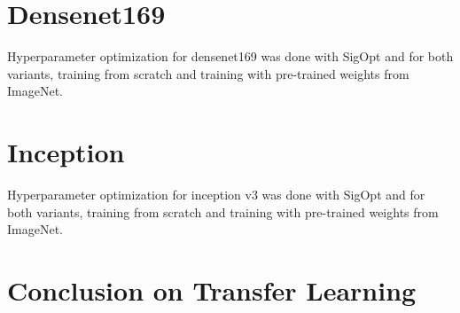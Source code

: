 




\section{Densenet169}

Hyperparameter optimization for densenet169 was done with SigOpt and for both variants, training from scratch and training with pre-trained weights from ImageNet.

\begin{table}[h] \centering
{}
\caption{Hyper parameters for densenet121 optimized with SigOpt. First row shows hyperparameters training the architecture from scratch. Second row used pre-trained weights from ImageNet}
\label{tbl:Densenet169}
\end{table}













\section{Inception}


Hyperparameter optimization for inception v3 was done with SigOpt and for both variants, training from scratch and training with pre-trained weights from ImageNet.

\begin{table}[h] \centering
{}
\caption{Hyper parameters for inception v3 optimized with SigOpt. First row shows hyperparameters training the architecture from scratch. Second row used pre-trained weights from ImageNet}
\label{tbl:Inceptionv3}
\end{table}

\section{Conclusion on Transfer Learning}



